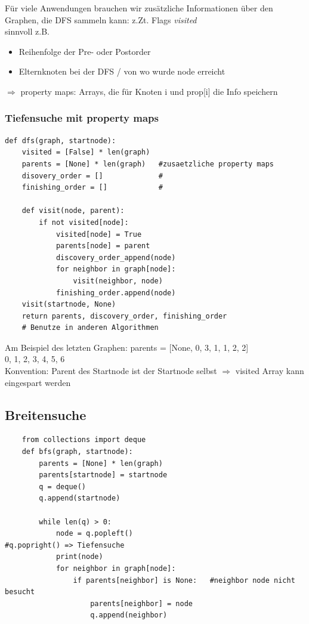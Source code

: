 \documentclass[11pt, fleqn]{scrreprt}
\begin{document}
    Für viele Anwendungen brauchen wir zusätzliche Informationen über den Graphen, die DFS sammeln kann: z.Zt. Flags \emph{visited} \\
    sinnvoll z.B.
    \begin{itemize}
        \item Reihenfolge der Pre- oder Postorder
        \item Elternknoten bei der DFS / von wo wurde node erreicht
    \end{itemize}
    $\Rightarrow$ property maps: Arrays, die für Knoten i und prop[i] die Info speichern

    \subsubsection*{Tiefensuche mit property maps}
    \begin{verbatim}
def dfs(graph, startnode):
    visited = [False] * len(graph)
    parents = [None] * len(graph)   #zusaetzliche property maps
    disovery_order = []             #
    finishing_order = []            #

    def visit(node, parent):
        if not visited[node]:
            visited[node] = True
            parents[node] = parent
            discovery_order_append(node)
            for neighbor in graph[node]:
                visit(neighbor, node)
            finishing_order.append(node)
    visit(startnode, None)
    return parents, discovery_order, finishing_order
    # Benutze in anderen Algorithmen
    \end{verbatim}

    Am Beispiel des letzten Graphen:
    parents = [None, 0, 3, 1, 1, 2, 2]\\
    \hspace*{8.3cm} 0, 1, 2, 3, 4, 5, 6\\

    Konvention: Parent des Startnode ist der Startnode selbst $\Rightarrow$ visited Array kann eingespart werden\\


    \subsection*{Breitensuche}
    \begin{verbatim}
    from collections import deque
    def bfs(graph, startnode):
        parents = [None] * len(graph)
        parents[startnode] = startnode
        q = deque()
        q.append(startnode)

        while len(q) > 0:
            node = q.popleft()                              #q.popright() => Tiefensuche
            print(node)
            for neighbor in graph[node]:
                if parents[neighbor] is None:   #neighbor node nicht besucht
                    parents[neighbor] = node
                    q.append(neighbor)
    \end{verbatim}
\end{document}
